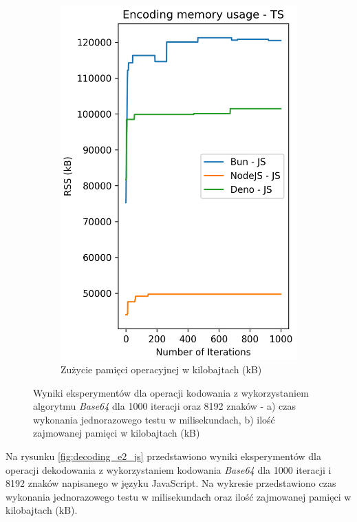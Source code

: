 \begin{figure}[H]
\begin{subfigure}[b]{0.4\textwidth}
    \includegraphics[width=\textwidth]{Figures/coding/base64_1000_encoding_js_memory.png}
    \caption{Zużycie pamięci operacyjnej w kilobajtach (kB)}
    \label{fig:encoding_e2_js_memory}
  \end{subfigure}
  \hfill
  \caption{Wyniki eksperymentów dla operacji kodowania z wykorzystaniem algorytmu \textit{Base64} dla 1000 iteracji oraz 8192 znaków - a) czas wykonania jednorazowego testu w milisekundach, b) ilość zajmowanej pamięci w kilobajtach (kB)}
  \label{fig:encoding_e2_js}
\end{figure}

Na rysunku \ref{fig:decoding_e2_js} przedstawiono wyniki eksperymentów dla operacji dekodowania z wykorzystaniem kodowania \textit{Base64} dla 1000 iteracji i 8192 znaków napisanego w języku JavaScript. Na wykresie przedstawiono czas wykonania jednorazowego testu w milisekundach oraz ilość zajmowanej pamięci w kilobajtach (kB).

